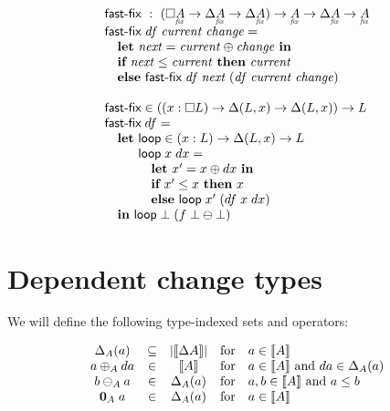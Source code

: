\documentclass{article}
\begin{document}
\[\begin{array}{l}
  \textsf{fast-fix} ~:~
  (\Disc{\fixtype{A}} \to \Ch\fixtype{A} \to \Ch\fixtype{A})
  \to \fixtype{A} \to \Ch\fixtype{A} \to \fixtype{A}\\
  \textsf{fast-fix}\; \mi{df}\; \mi{current}\; \mi{change} =\\
  \quad \textbf{let}~ {\mi{next} = \mi{current} \oplus \mi{change}}
  ~\textbf{in}\\
  \quad \textbf{if}~ \mi{next} \le \mi{current}
  ~\textbf{then}~ \mi{current}\\
  \quad \textbf{else}~ \textsf{fast-fix}\; \mi{df}\; \mi{next}
  \;(\mi{df}\; \mi{current}\; \mi{change})\\
  \\
  \textsf{fast-fix}
  \in ((x : \Disc{L}) \to \Delta(L, x) \to \Delta(L, x)) \to L
  \\
  \textsf{fast-fix} \; df =\\
  \quad\textbf{let}~ \textsf{loop} \in (x : L) \to \Delta(L, x) \to L\\
  \quad\phantom{\textbf{let}~} \textsf{loop} \;x \;dx =\\
  \quad\phantom{\textbf{let}~}\quad
  \textbf{let}~ x' = x \oplus dx ~\textbf{in}\\
  \quad\phantom{\textbf{let}~}\quad
  \textbf{if}~ x' \le x ~\textbf{then}~ x\\
  \quad\phantom{\textbf{let}~}\quad
  \textbf{else}~\textsf{loop} \;x' \;(df \; x \; dx)\\
  \quad\textbf{in}~ \textsf{loop} \; \unit \; (f \; \unit \ominus \unit)
\end{array}\]


\section{Dependent change types}

We will define the following type-indexed sets and operators:

\[\begin{array}{ccccl}
  \Delta_{A}({a}) &\subseteq& |{\llbracket{\Delta{A}}\rrbracket}|
  &\text{for}& a \in {\llbracket{A}\rrbracket}
  \\
  a \oplus_A da &\in& {\llbracket{A}\rrbracket}
  &\text{for}& a \in {\llbracket{A}\rrbracket} ~\text{and}~ da \in \Delta_{A}({a})
  \\
  b \ominus_A a &\in& \Delta_{A}({a})
  &\text{for}& a, b \in {\llbracket{A}\rrbracket} ~\text{and}~ a \le b
  \\
  \mathbf{0}_A\; a &\in& \Delta_{A}({a})
  &\text{for}& a \in {\llbracket{A}\rrbracket}
\end{array}\]
\end{document}
